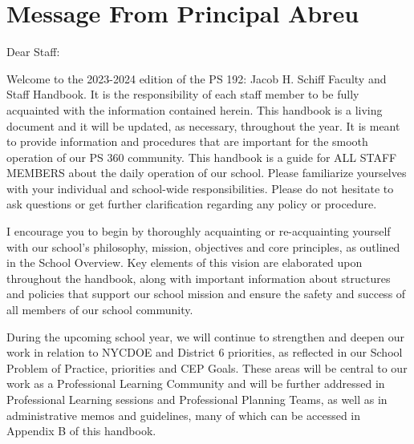 \documentclass[11pt, letterpaper]{article}
\begin{document}
\sloppy
\thispagestyle{empty}


\pagenumbering{\fancyhf{}}
\pagestyle{headings}
\fancyhead[L]{\textit{\rightmark}}
\fancyhead[R]{\thepage}
\pagestyle{fancy}
\renewcommand{\footrulewidth}{1px}



\newpage
\tableofcontents

\newpage
\section{Message From Principal Abreu}

Dear Staff:

Welcome to the 2023-2024 edition of the PS 192: Jacob H. Schiff  Faculty and Staff Handbook. It is the responsibility of each staff member to be fully acquainted with the information contained herein. This handbook is a living document and it will be updated, as necessary, throughout the year. It is meant to provide information and procedures that are important for the smooth operation of our PS 360 community. This handbook is a guide for ALL STAFF MEMBERS about the daily operation of our school. Please familiarize yourselves with your individual and school-wide responsibilities. Please do not hesitate to ask questions or get further clarification regarding any policy or procedure.

I encourage you to begin by thoroughly acquainting or re-acquainting yourself with our school’s philosophy, mission, objectives and core principles, as outlined in the School Overview. Key elements of this vision are elaborated upon throughout the handbook, along with important information about structures and policies that support our school mission and ensure the safety and success of all members of our school community. 

During the upcoming school year, we will continue to strengthen and deepen our work in relation to NYCDOE and District 6 priorities, as reflected in our School Problem of Practice, priorities and CEP Goals. These areas will be central to our work as a Professional Learning Community and will be further addressed in Professional Learning sessions and Professional Planning Teams, as well as in administrative memos and guidelines, many of which can be accessed in Appendix B of this handbook.
\end{document}
